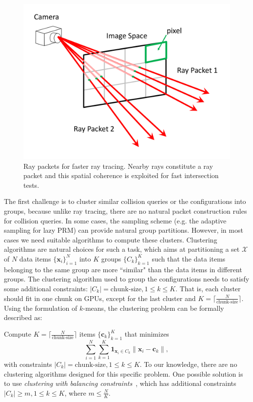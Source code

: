 \begin{figure}[htb]
  \centering
  \includegraphics[width=\linewidth]{figs/5/raypacket.pdf}
  \caption[Ray packets for faster GPU-based ray tracing]{Ray packets for faster ray tracing. Nearby rays constitute a ray packet and this spatial coherence is
  exploited for fast intersection tests.}
  \label{fig:5:raypacket}
\end{figure}

The first challenge is to cluster similar collision queries or the configurations into groups, because unlike
ray tracing, there are no natural packet construction rules for collision queries. In some cases, the sampling scheme (e.g. the adaptive sampling for lazy PRM) can provide natural group partitions. However, in most cases
we need suitable algorithms to compute these clusters. Clustering algorithms are natural choices for such a task, which aims
at partitioning a set $\mathcal{X}$ of $N$ data items $\{\mathbf{x}_i\}_{i=1}^N$ into $K$ groups $\{C_k\}_{k=1}^K$ such that the data items belonging to the same group are more ``similar" than the data items in different groups. The clustering algorithm
used to group the configurations needs to satisfy some additional constraints: $|C_k| = \text{chunk-size}, 1\leq k \leq K$. That is, each cluster should fit in one chunk on GPUs, except for the last cluster and $K = \lceil \frac{N}{\text{chunk-size}} \rceil$. Using the formulation of $k$-means, the clustering problem can be formally described as:

\noindent Compute $K = \lceil \frac{N}{\text{chunk-size}} \rceil$ items $\{\mathbf{c}_k\}_{k=1}^K$ that minimizes
\begin{equation}
\label{eq:5:cluster}
\sum_{i=1}^N\sum_{k=1}^K \mathbf{1}_{\mathbf{x}_i \in C_k} \|\mathbf{x}_i - \mathbf{c}_k\|,
\end{equation}
with constraints $|C_k| = \text{chunk-size}, 1\leq k \leq K$. To our knowledge, there are no clustering algorithms designed
for this specific problem. One possible solution is to use \emph{clustering with balancing constraints}~\cite{Banerjee:2006},
which has additional constraints $|C_k| \geq m, 1\leq k \leq K$, where $m \leq \frac{N}{K}$.

